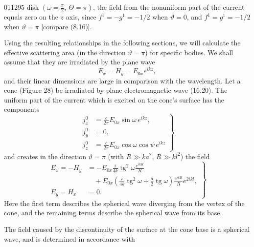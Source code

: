 \begin{scanpage}{0112}{95}
disk $(\omega=\frac\pi2,\ \Theta=\pi)$, the field from the nonuniform part of the current equals zero on the $z$ axis, since $f^1=-g^1=-1/2$ when $\vartheta=0$, and $f^1=g^1=-1/2$ when $\vartheta=\pi$ [compare (8.16)].

Using the resulting relationships in the following sections, we will calculate the effective scattering area (in the direction $\vartheta=\pi$) for specific bodies. We shall assume that they are irradiated by the plane wave
\[E_x=H_y=E_{0x}e^{ikz},\tag{16.20}\]
and their linear dimensions are large in comparison with the wavelength.
Let a cone (Figure 28) be irradiated by plane electromagnetic wave (16.20). The uniform part of the current which is excited on the cone's surface has the components
\[\left.\begin{aligned}j_x^0&=\frac c{2\pi}E_{0x}\sin\omega\,e^{ikz},\\j_y^0&=0,\\j_z^0&=\frac c{2\pi}E_{0x}\cos\omega\cos\psi\,e^{ikz}\end{aligned}\right\}\tag{17.01}\]
and creates in the direction $\vartheta=\pi$ (with $R\gg ka^2$, $R\gg kl^2$) the field
\[\left.\begin{aligned}E_x=-H_y&=-E_{0x}\frac i{4k}\operatorname{tg}^2\omega\frac{e^{ikR}}R\\&\quad+E_{0x}\left(\frac i{4k}\operatorname{tg}^2\omega+\frac a2\operatorname{tg}\omega\right)\frac{e^{ikR}}R e^{2ikl},\\E_y=H_x&=0.
\end{aligned}\right\}\tag{17.02}\]
Here the first term describes the spherical wave diverging from the vertex of the cone, and the remaining terms describe the spherical wave from its base.

The field caused by the discontinuity of the surface at the cone base is a spherical wave, and is determined in accordance with
\end{scanpage}
